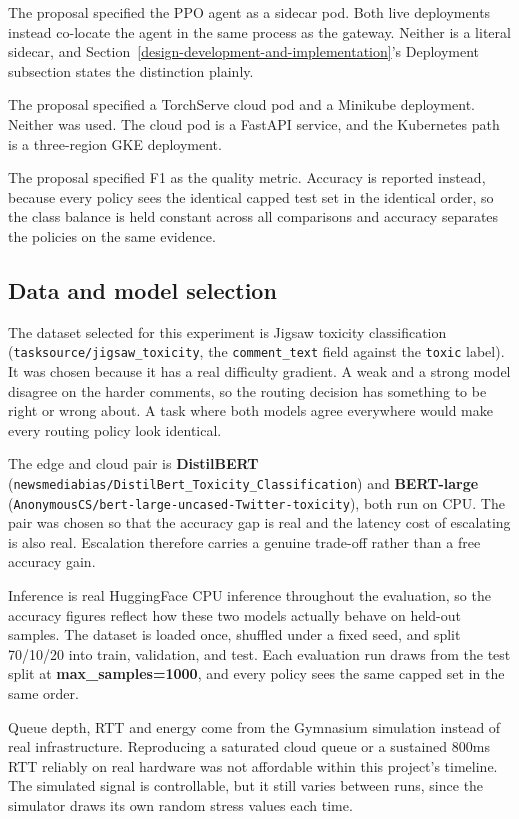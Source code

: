 The proposal specified the PPO agent as a sidecar pod. Both live
deployments instead co-locate the agent in the same process as the
gateway. Neither is a literal sidecar, and Section~\ref{design-development-and-implementation}'s Deployment
subsection states the distinction plainly.

The proposal specified a TorchServe cloud pod and a Minikube
deployment. Neither was used. The cloud pod is a FastAPI service, and
the Kubernetes path is a three-region GKE deployment.

The proposal specified F1 as the quality metric. Accuracy is reported
instead, because every policy sees the identical capped test set in the
identical order, so the class balance is held constant across all
comparisons and accuracy separates the policies on the same evidence.

\hypertarget{data-and-model-selection}{%
\subsection{Data and model selection}\label{data-and-model-selection}}

The dataset selected for this experiment is Jigsaw toxicity classification
(\texttt{tasksource/jigsaw\_toxicity}, the \texttt{comment\_text} field
against the \texttt{toxic} label). It was chosen because it has a real
difficulty gradient. A weak and a strong model disagree on the
harder comments, so the routing decision has something to be right or
wrong about. A task where both models agree everywhere would make every
routing policy look identical.

The edge and cloud pair is \textbf{DistilBERT}
(\texttt{newsmediabias/DistilBert\_Toxicity\_Classification}) and
\textbf{BERT-large}
(\texttt{AnonymousCS/bert-large-uncased-Twitter-toxicity}), both run on
CPU. The pair was chosen so that the accuracy gap is real and the latency
cost of escalating is also real. Escalation therefore carries a genuine
trade-off rather than a free accuracy gain.

Inference is real HuggingFace CPU inference throughout the evaluation, 
so the accuracy figures  reflect how these two models actually behave on
held-out samples. The dataset is loaded once, shuffled under a fixed seed,
and split 70/10/20 into train, validation, and test. Each evaluation run draws
from the test split at \textbf{max\_samples=1000}, and every policy sees the
same capped set in the same order.

Queue depth, RTT and energy come from the Gymnasium simulation instead
of real infrastructure. Reproducing a saturated cloud queue or a
sustained 800ms RTT reliably on real hardware was not affordable
within this project's timeline. The simulated signal is controllable,
but it still varies between runs, since the simulator draws its own
random stress values each time.

